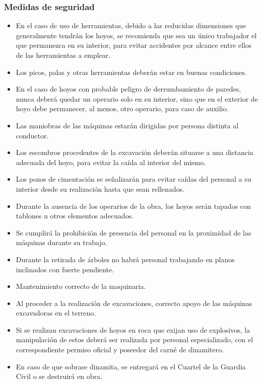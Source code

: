\subsubsection{Medidas de seguridad}
\label{subsubsec:sysExcavacion-MS}
\begin{itemize}
    \item En el caso de uso de herramientas, debido a las reducidas dimensiones que generalmente tendrán los hoyos, se recomienda que sea un único trabajador el que permanezca en su interior, para evitar accidentes por alcance entre ellos de las herramientas a emplear.
    \item Los picos, palas y otras herramientas deberán estar en buenas condiciones.
    \item En el caso de hoyos con probable peligro de derrumbamiento de paredes, nunca deberá quedar un operario solo en su interior, sino que en el exterior de hoyo debe permanecer, al menos, otro operario, para caso de auxilio.
    \item Las maniobras de las máquinas estarán dirigidas por persona distinta al conductor.
    \item Los escombros procedentes de la excavación deberán situarse a una distancia adecuada del hoyo, para evitar la caída al interior del mismo.
    \item Los pozos de cimentación se señalizarán para evitar caídas del personal a su interior desde su realización hasta que sean rellenados.
    \item Durante la ausencia de los operarios de la obra, los hoyos serán tapados con tablones u otros elementos adecuados.
    \item Se cumplirá la prohibición de presencia del personal en la proximidad de las máquinas durante su trabajo. 
    \item Durante la retirada de árboles no habrá personal trabajando en planos inclinados con fuerte pendiente.
    \item Mantenimiento correcto de la maquinaria.
    \item Al proceder a la realización de excavaciones, correcto apoyo de las máquinas excavadoras en el terreno.
    \item Si se realizan excavaciones de hoyos en roca que exijan uso de explosivos, la manipulación de estos deberá ser realizada por personal especializado, con el correspondiente permiso oficial y poseedor del carné de dinamitero.
    \item En caso de que sobrase dinamita, se entregará en el Cuartel de la Guardia Civil o se destruirá en obra.
\end{itemize}
